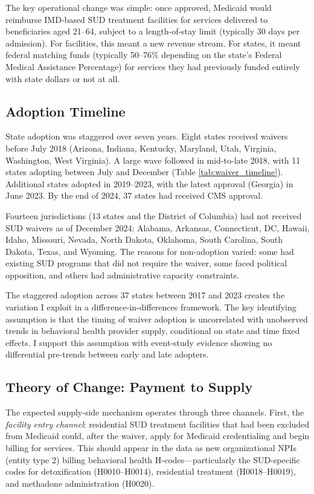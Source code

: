 \documentclass[12pt]{article}
\begin{document}
The key operational change was simple: once approved, Medicaid would reimburse IMD-based SUD treatment facilities for services delivered to beneficiaries aged 21--64, subject to a length-of-stay limit (typically 30 days per admission). For facilities, this meant a new revenue stream. For states, it meant federal matching funds (typically 50--76\% depending on the state's Federal Medical Assistance Percentage) for services they had previously funded entirely with state dollars or not at all.

\subsection{Adoption Timeline}

State adoption was staggered over seven years. Eight states received waivers before July 2018 (Arizona, Indiana, Kentucky, Maryland, Utah, Virginia, Washington, West Virginia). A large wave followed in mid-to-late 2018, with 11 states adopting between July and December (Table \ref{tab:waiver_timeline}). Additional states adopted in 2019--2023, with the latest approval (Georgia) in June 2023. By the end of 2024, 37 states had received CMS approval.

Fourteen jurisdictions (13 states and the District of Columbia) had not received SUD waivers as of December 2024: Alabama, Arkansas, Connecticut, DC, Hawaii, Idaho, Missouri, Nevada, North Dakota, Oklahoma, South Carolina, South Dakota, Texas, and Wyoming. The reasons for non-adoption varied: some had existing SUD programs that did not require the waiver, some faced political opposition, and others had administrative capacity constraints.

The staggered adoption across 37 states between 2017 and 2023 creates the variation I exploit in a difference-in-differences framework. The key identifying assumption is that the timing of waiver adoption is uncorrelated with unobserved trends in behavioral health provider supply, conditional on state and time fixed effects. I support this assumption with event-study evidence showing no differential pre-trends between early and late adopters.

\subsection{Theory of Change: Payment to Supply}

The expected supply-side mechanism operates through three channels. First, the \textit{facility entry channel}: residential SUD treatment facilities that had been excluded from Medicaid could, after the waiver, apply for Medicaid credentialing and begin billing for services. This should appear in the data as new organizational NPIs (entity type 2) billing behavioral health H-codes---particularly the SUD-specific codes for detoxification (H0010--H0014), residential treatment (H0018--H0019), and methadone administration (H0020).
\end{document}
